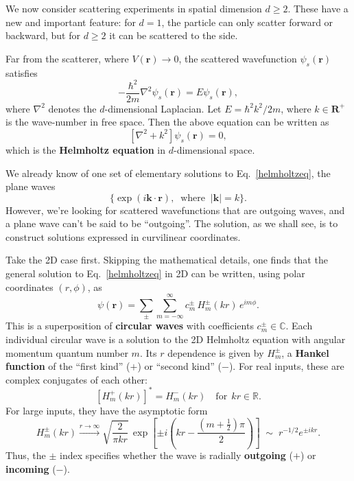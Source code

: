 \documentclass[pra,12pt]{revtex4}
\begin{document}
We now consider scattering experiments in spatial dimension $d \ge 2$.
These have a new and important feature: for $d = 1$, the particle can
only scatter forward or backward, but for $d \ge 2$ it can be
scattered to the side.

Far from the scatterer, where $V(\mathbf{r})\rightarrow 0$, the
scattered wavefunction $\psi_s(\mathbf{r})$ satisfies
\begin{equation}
  -\frac{\hbar^2}{2m} \nabla^2 \psi_s(\mathbf{r}) = E \psi_s(\mathbf{r}),
\end{equation}
where $\nabla^2$ denotes the $d$-dimensional Laplacian.  Let $E =
\hbar^2 k^2 / 2m$, where $k \in \mathbf{R}^+$ is the wave-number in
free space.  Then the above equation can be written as
\begin{equation}
  \left[\nabla^2 + k^2\right] \psi_s(\mathbf{r}) = 0,
  \label{helmholtzeq}
\end{equation}
which is the \textbf{Helmholtz equation} in $d$-dimensional space.

We already know of one set of elementary solutions to
Eq.~\eqref{helmholtzeq}, the plane waves
\begin{equation*}
  \big\{\exp(i\mathbf{k}\cdot\mathbf{r}),\;\;\mathrm{where}\;\;
  |\mathbf{k}| = k \big\}.
\end{equation*}
However, we're looking for scattered wavefunctions that are outgoing
waves, and a plane wave can't be said to be ``outgoing''.  The
solution, as we shall see, is to construct solutions expressed in
curvilinear coordinates.

Take the 2D case first.  Skipping the mathematical details, one finds
that the general solution to Eq.~\eqref{helmholtzeq} in 2D can be
written, using polar coordinates $(r,\phi)$, as
\begin{equation}
  \psi(\mathbf{r})=\sum_{\pm}\sum_{m=-\infty}^\infty c_m^\pm\, H_m^\pm(kr)\,e^{im\phi}.
\end{equation}
This is a superposition of \textbf{circular waves} with coefficients
$c_m^\pm \in \mathbb{C}$.  Each individual circular wave is a solution
to the 2D Helmholtz equation with angular momentum quantum number $m$.
Its $r$ dependence is given by $H_m^\pm$, a \textbf{Hankel function}
of the ``first kind'' ($+$) or ``second kind'' ($-$).  For real
inputs, these are complex conjugates of each other:
\begin{equation}
  \left[H^+_m(kr)\right]^* = H^-_m(kr) \quad\mathrm{for}\;\,kr \in \mathbb{R}.
\end{equation}
For large inputs, they have the asymptotic form
\begin{equation}
  H_m^\pm(kr) \overset{r\rightarrow\infty}{\longrightarrow} \sqrt{\frac{2}{\pi kr}} \, \exp\left[\pm i\left(kr - \frac{(m+\frac{1}{2})\pi}{2}\right)\right] \;\sim\; r^{-1/2} e^{\pm ikr}.
\end{equation}
Thus, the $\pm$ index specifies whether the wave is radially
\textbf{outgoing} ($+$) or \textbf{incoming} ($-$).
\end{document}
